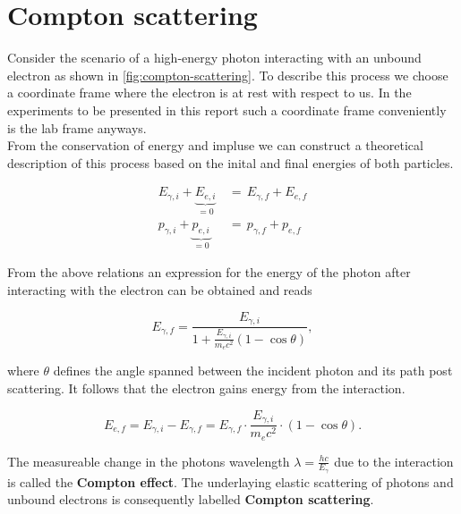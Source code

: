 
\section{Compton scattering}
\label{sec:compton-scattering}

Consider the scenario of a high-energy photon interacting with an unbound electron as
shown in \autoref{fig:compton-scattering}. To describe this process we choose a 
coordinate frame where the electron is at rest with respect to us. In the experiments
to be presented in this report such a coordinate frame conveniently is the lab frame 
anyways. \\
From the conservation of energy and impluse we can construct a theoretical 
description of this process based on the inital and final energies of both particles.

\begin{align*}
E_{\gamma,i} + \underbrace{E_{e,i}}_{=0}\,&=\,E_{\gamma,f}+E_{e,f} \\ 
p_{\gamma,i} + \underbrace{p_{e,i}}_{=0}\,&=\,p_{\gamma,f}+p_{e,f}  
\end{align*}

From the above relations an expression for the energy of the photon after interacting
with the electron can be obtained and reads

\begin{equation}
\label{eq:photon-energy}
E_{\gamma,f}=\frac{E_{\gamma,i}}{1+\frac{E_{\gamma,i}}{m_e c^2}(1-\cos\theta)},
\end{equation}

where $\theta$ defines the angle spanned between the incident photon and its path
post scattering. It follows that the electron gains energy from the interaction.

\begin{equation}
\label{eq:electron-energy}
E_{e,f}=E_{\gamma,i}-E_{\gamma,f}=E_{\gamma,f}\cdot\frac{E_{\gamma,i}}{m_e c^2}\cdot(1-\cos\theta).
\end{equation}

The measureable change in the photons wavelength $\lambda=\frac{hc}{E_{\gamma}}$ 
due to the interaction is called the \textbf{Compton effect}. The underlaying elastic
scattering of photons and unbound electrons is consequently labelled \textbf{Compton 
scattering}. 
